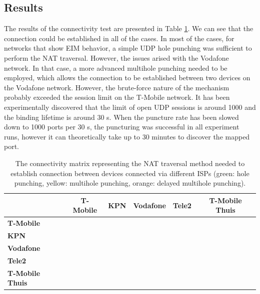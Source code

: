 \subsection{Results}

The results of the connectivity test are presented in Table \ref{table_cgnat_analysis}. We can see that the connection could be established in all of the cases. In most of the cases, for networks that show EIM behavior, a simple UDP hole punching was sufficient to perform the NAT traversal. However, the issues arised with the Vodafone network. In that case, a more advanced multihole punching needed to be employed, which allows the connection to be established between two devices on the Vodafone network. However, the brute-force nature of the mechanism probably exceeded the session limit on the T-Mobile network. It has been experimentally discovered that the limit of open UDP sessions is around 1000 and the binding lifetime is around 30 s. When the puncture rate has been slowed down to 1000 ports per 30 s, the puncturing was successful in all experiment runs, however it can theoretically take up to 30 minutes to discover the mapped port.

\begin{table}[h!]
    \centering
    \begin{tabular}{ | l | c | c | c | c | c | }
        \hline
        \textbf{} & \textbf{T-Mobile} & \textbf{KPN} & \textbf{Vodafone} & \textbf{Tele2} & \textbf{T-Mobile Thuis} \\
        \hline
        \textbf{T-Mobile} & \cellcolor{green!25} &  &  &  &  \\
        \hline
        \textbf{KPN} & \cellcolor{green!25}& \cellcolor{green!25} &  &  &  \\
        \hline
        \textbf{Vodafone} & \cellcolor{orange!25} & \cellcolor{yellow!25} & \cellcolor{yellow!25} &  &  \\
        \hline
        \textbf{Tele2} & \cellcolor{green!25} & \cellcolor{green!25} & \cellcolor{green!25} & \cellcolor{green!25} & \\
        \hline
        \textbf{T-Mobile Thuis} & \cellcolor{green!25} & \cellcolor{green!25} & \cellcolor{green!25} & \cellcolor{green!25} & \cellcolor{green!25} \\
        \hline
    \end{tabular}
    \caption{The connectivity matrix representing the NAT traversal method needed to establish connection between devices connected via different ISPs (green: hole punching, yellow: multihole punching, orange: delayed multihole punching).}
    \label{table_cgnat_analysis}
\end{table}

